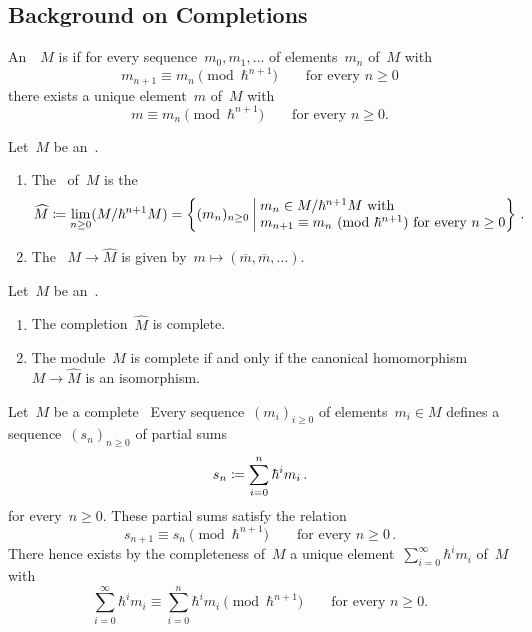 \documentclass[a4paper, 11pt, oneside]{scrartcl}
\begin{document}
\subsection{Background on Completions}


\begin{definition}
  An~\module{$\kfhbar$}~$M$ is  if for every sequence~$m_0, m_1, \dotsc$ of elements~$m_n$ of~$M$ with  
  \[
    m_{n+1} \equiv m_n
    \pmod{\hbar^{n+1}}
    \qquad
    \text{for every~$n \geq 0$}
  \]
  there exists a unique element~$m$ of~$M$ with
  \[
    m \equiv m_n
    \pmod{\hbar^{n+1}}
    \qquad
    \text{for every~$n \geq 0$.}
  \]
\end{definition}

\begin{definition}
  Let~$M$ be an~\module{$\kfhbar$}.
  \begin{enumerate}
    \item
      The~ of~$M$ is the~\module{$\kfhbar$}
      \[
        \widehat{M}
        \defined
        \lim_{n \geq 0} (M / \hbar^{n+1} M)
        =
        \left\{
          (m_n)_{n \geq 0}
        \suchthat*
          \begin{tabular}{@{}l@{}}
            $m_n \in M/ \hbar^{n+1} M$ with \\
            $m_{n+1} \equiv m_n \pMod{\hbar^{n+1}}$ for every~$n \geq 0$
          \end{tabular}
        \right\} \,.
      \]
    \item
      The ~$M \to \widehat{M}$ is given by~$m \mapsto (\overline{m}, \overline{m}, \dotsc)$.
  \end{enumerate}
\end{definition}

\begin{proposition}
  Let~$M$ be an~\module{$\kfhbar$}.
  \begin{enumerate}
    \item
      The completion~$\widehat{M}$ is complete.
    \item
      The module~$M$ is complete if and only if the canonical homomorphism~$M \to \widehat{M}$ is an isomorphism.
  \end{enumerate}
\end{proposition}

\begin{remark}
  Let~$M$ be a complete~\module{$\kfhbar$}
  Every sequence~$(m_i)_{i \geq 0}$ of elements~$m_i \in M$ defines a sequence~$(s_n)_{n \geq 0}$ of partial sums
  \[
    s_n
    \coloneqq
    \sum_{i=0}^n \hbar^i m_i \,.
  \]
  for every~$n \geq 0$.
  These partial sums satisfy the relation
  \[
    s_{n+1} \equiv s_n
    \pmod{\hbar^{n+1}}
    \qquad
    \text{for every~$n \geq 0$} \,.
  \]
  There hence exists by the completeness of~$M$ a unique element~$\sum_{i=0}^\infty \hbar^i m_i$ of~$M$ with
  \[
    \sum_{i=0}^\infty \hbar^i m_i
    \equiv
    \sum_{i=0}^n \hbar^i m_i
    \pmod{\hbar^{n+1}}
    \qquad
    \text{for every~$n \geq 0$.}
  \]
\end{remark}
\end{document}
